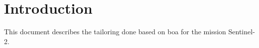 \chapter{Introduction}\label{c:intro}

This document describes the tailoring done based on \acrshort{boa} for the mission Sentinel-2.
